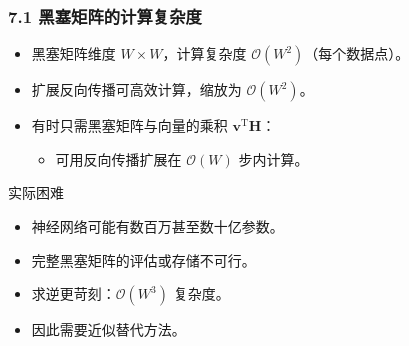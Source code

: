 \documentclass[t,aspectratio=169]{beamer} %
\begin{document}
\begin{frame}
    \frametitle{7.1 黑塞矩阵的计算复杂度}
    \begin{itemize}
        \item 黑塞矩阵维度 $W \times W$，计算复杂度 $\mathcal{O}(W^2)$（每个数据点）。
        \item 扩展反向传播可高效计算，缩放为 $\mathcal{O}(W^2)$。
        \item 有时只需\alert{黑塞矩阵与向量的乘积} $\mathbf{v}^\mathrm{T} \mathbf{H}$：
        \begin{itemize}
            \item 可用反向传播扩展在 $\mathcal{O}(W)$ 步内计算。
        \end{itemize}
    \end{itemize}
    \begin{block}{实际困难}
        \begin{itemize}
            \item 神经网络可能有数百万甚至数十亿参数。
            \item 完整黑塞矩阵的\alert{评估或存储不可行}。
            \item 求逆更苛刻：$\mathcal{O}(W^3)$ 复杂度。
            \item 因此需要\alert{近似替代方法}。
        \end{itemize}
    \end{block}
\end{frame}
\end{document}
